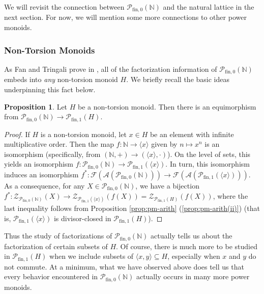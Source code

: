 \documentclass{report}
\newcommand{\A}{\mathscr{A}}
\newcommand{\F}{\mathscr{F}}
\newcommand{\NN}{\mathbb{N}}
\renewcommand{\P}{\mathcal{P}}
\newcommand{\Z}{\mathcal{Z}}
\newcommand{\gen}[1]{\langle #1 \rangle}
\newcommand{\fin}{\textrm{fin}}
\newcommand{\fun}{{\textrm{fin}, 1}}
\renewcommand{\:}{\text{:}}
\newcommand{\PN}{{\P_{\fin,0}(\NN)}}
\theoremstyle{definition}
\newtheorem{prop}[defn]{Proposition}
\begin{document}
We will revisit the connection between $\PN$ and the natural lattice in the next section.
For now, we will mention some more connections to other power monoids.



\subsubsection*{Non-Torsion Monoids}

As Fan and Tringali prove in \cite[Theorem 3.8, Theorem 4.11]{fan-tringali18}, all of the factorization information of $\PN$ embeds into \textit{any} non-torsion monoid $H$.
We briefly recall the basic ideas underpinning this fact below.
	
\begin{prop}\label{prop:natural-to-non-tors}
Let $H$ be a non-torsion monoid.
Then there is an equimorphism from $\PN \to \P_\fun(H)$.
\end{prop}
\begin{proof}
If $H$ is a non-torsion monoid, let $x\in H$ be an element with infinite multiplicative order.  
Then the map $f: \NN \to \gen{x}$ given by $n\mapsto x^n$ is an isomorphism (specifically, from $(\NN,+)\to (\gen{x},\cdot)$).
On the level of sets, this yields an isomorphism $f: \PN \to \P_\fun(\gen{x})$.
In turn, this isomorphism induces an isomorphism $f^*: \F(\A(\PN)) \to \F(\A(\P_\fun(\gen{x})))$.
As a consequence, for any $X \in \PN$, we have a bijection $f^*: \Z_{\PN}(X) \to \Z_{\P_\fun(\gen{x})}(f(X)) = \Z_{\P_\fun(H)}(f(X))$, where the last inequality follows from Proposition \ref{prop:pm-arith} (\ref{prop:pm-arith(ii)}) (that is, $\P_\fun(\gen{x})$ is divisor-closed in $\P_\fun(H)$).
\end{proof}

Thus the study of factorizations of $\PN$ actually tells us about the factorization of certain subsets of $H$.
Of course, there is much more to be studied in $\P_\fun(H)$ when we include subsets of $\gen{x,y}\subseteq H$, especially when $x$ and $y$ do not commute.
At a minimum, what we have observed above does tell us that every behavior encountered in $\PN$ actually occurs in many more power monoids.
\end{document}
